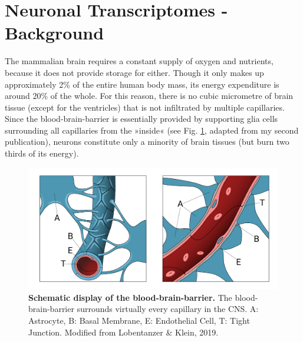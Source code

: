 \section{Neuronal Transcriptomes - Background}
The mammalian brain requires a constant supply of oxygen and nutrients, because it does not provide storage for either. Though it only makes up approximately 2\% of the entire human body mass, its energy expenditure is around 20\% of the whole\cite{Raichle2002}. For this reason, there is no cubic micrometre of brain tissue (except for the ventricles) that is not infiltrated by multiple capillaries. Since the blood-brain-barrier is essentially provided by supporting glia cells surrounding all capillaries from the »inside« (see Fig. \ref{fig:bbb}, adapted from my second publication\cite{Lobentanzer2019b}), neurons constitute only a minority of brain tissues (but burn two thirds of its energy).

\begin{figure}
\includegraphics[width=\textwidth]{figures/bbb}
\caption[The blood-brain-barrier.]{\textbf{Schematic display of the blood-brain-barrier.} The blood-brain-barrier surrounds virtually every capillary in the CNS. A: Astrocyte, B: Basal Membrane, E: Endothelial Cell, T: Tight Junction. Modified from Lobentanzer \& Klein, 2019\cite{Lobentanzer2019b}.
\label{fig:bbb}}
\end{figure}

